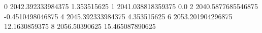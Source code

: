 0 2042.392333984375 1.353515625
1 2041.038818359375 0.0
2 2040.5877685546875 -0.4510498046875
4 2045.392333984375 4.353515625
6 2053.201904296875 12.1630859375
8 2056.50390625 15.465087890625
